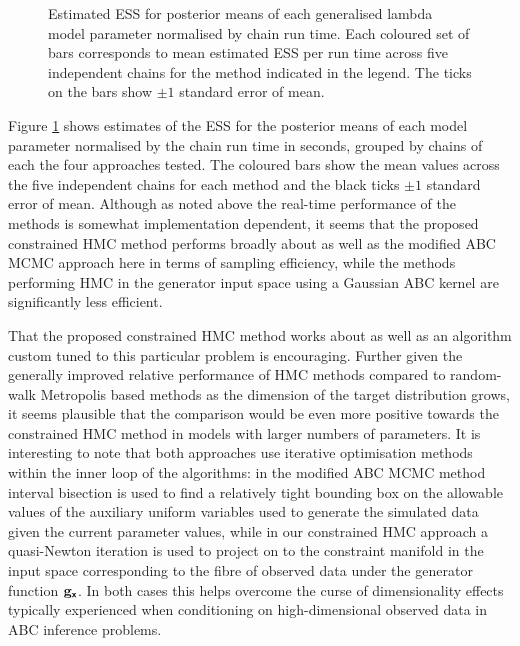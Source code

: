 \begin{figure}
\centering
{}
\caption[Generalised $\lambda$ parameter \acs{ESS} estimates.]{Estimated \ac{ESS} for posterior means of each generalised lambda model parameter normalised by chain run time. Each coloured set of bars corresponds to mean estimated \ac{ESS} per run time across five independent chains for the method indicated in the legend. The ticks on the bars show $\pm 1$ standard error of mean.}
\label{fig:generalised-lambda-param-posterior-ess-plot}
\end{figure}

Figure \ref{fig:generalised-lambda-param-posterior-ess-plot} shows estimates of the \ac{ESS} for the posterior means of each model parameter normalised by the chain run time in seconds, grouped by chains of each the four approaches tested. The coloured bars show the mean values across the five independent chains for each method and the black ticks $\pm 1$ standard error of mean. Although as noted above the real-time performance of the methods is somewhat implementation dependent, it seems that the proposed constrained \ac{HMC} method performs broadly about as well as the modified \ac{ABC} \ac{MCMC} approach here in terms of sampling efficiency, while the methods performing \ac{HMC} in the generator input space using a Gaussian \ac{ABC} kernel are significantly less efficient. 

That the proposed constrained \ac{HMC} method works about as well as an algorithm custom tuned to this particular problem is encouraging. Further given the generally improved relative performance of \ac{HMC} methods compared to random-walk Metropolis based methods as the dimension of the target distribution grows, it seems plausible that the comparison would be even more positive towards the constrained \ac{HMC} method in models with larger numbers of parameters. It is interesting to note that both approaches use iterative optimisation methods within the inner loop of the algorithms: in the modified \ac{ABC} \ac{MCMC} method interval bisection is used to find a relatively tight bounding box on the allowable values of the auxiliary uniform variables used to generate the simulated data given the current parameter values, while in our constrained \ac{HMC} approach a quasi-Newton iteration is used to project on to the constraint manifold in the input space corresponding to the fibre of observed data under the generator function ${\mathbf{g}}_{\boldsymbol{\mathsf{x}}}$. In both cases this helps overcome the curse of dimensionality effects typically experienced when conditioning on high-dimensional observed data in \ac{ABC} inference problems.

